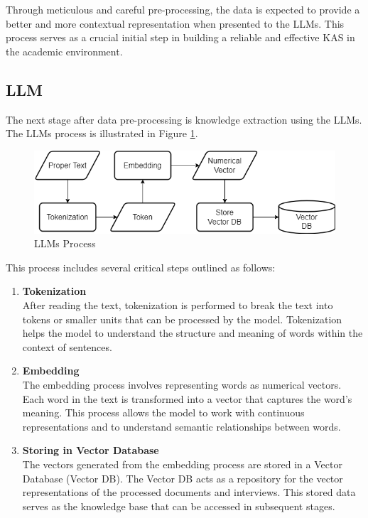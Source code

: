 \documentclass[runningheads]{llncs}
\begin{document}
Through meticulous and careful pre-processing, the data is expected to provide a better and more contextual representation when presented to the LLMs. This process serves as a crucial initial step in building a reliable and effective KAS in the academic environment.

\subsection{LLM}
The next stage after data pre-processing is knowledge extraction using the LLMs. The LLMs process is illustrated in Figure \ref{fig:llm}.

\begin{figure}[htbp]
    \centerline{\includegraphics[scale=0.4]{eng-llm.png}}
    \caption{LLMs Process}
    \label{fig:llm}
\end{figure}

This process includes several critical steps outlined as follows:

\begin{enumerate}  
    \item \textbf{Tokenization} \\
    After reading the text, tokenization is performed to break the text into tokens or smaller units that can be processed by the model. Tokenization helps the model to understand the structure and meaning of words within the context of sentences.
    
    \item \textbf{Embedding} \\
    The embedding process involves representing words as numerical vectors. Each word in the text is transformed into a vector that captures the word's meaning. This process allows the model to work with continuous representations and to understand semantic relationships between words.
    
    \item \textbf{Storing in Vector Database} \\
    The vectors generated from the embedding process are stored in a Vector Database (Vector DB). The Vector DB acts as a repository for the vector representations of the processed documents and interviews. This stored data serves as the knowledge base that can be accessed in subsequent stages.
\end{enumerate}
\end{document}
